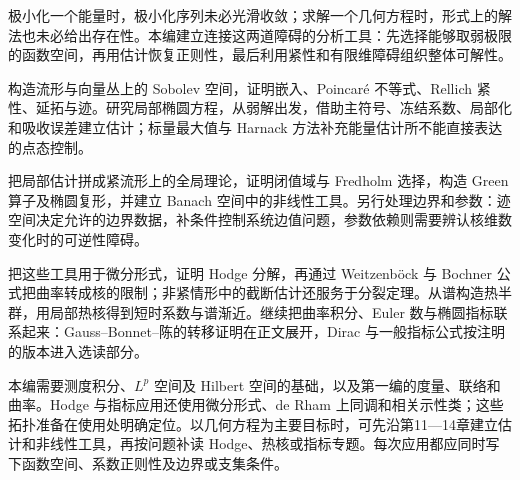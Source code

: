 
% 

\BookPartGuide
极小化一个能量时，极小化序列未必光滑收敛；求解一个几何方程时，形式上的解法也未必给出存在性。本编建立连接这两道障碍的分析工具：先选择能够取弱极限的函数空间，再用估计恢复正则性，最后利用紧性和有限维障碍组织整体可解性。

\ProseParagraphBreak
{}构造流形与向量丛上的 Sobolev 空间，证明嵌入、Poincaré 不等式、Rellich 紧性、延拓与迹。研究局部椭圆方程，从弱解出发，借助主符号、冻结系数、局部化和吸收误差建立估计；标量最大值与 Harnack 方法补充能量估计所不能直接表达的点态控制。

\ProseParagraphBreak
{}把局部估计拼成紧流形上的全局理论，证明闭值域与 Fredholm 选择，构造 Green 算子及椭圆复形，并建立 Banach 空间中的非线性工具。另行处理边界和参数：迹空间决定允许的边界数据，补条件控制系统边值问题，参数依赖则需要辨认核维数变化时的可逆性障碍。

\ProseParagraphBreak
{}把这些工具用于微分形式，证明 Hodge 分解，再通过 Weitzenböck 与 Bochner 公式把曲率转成核的限制；非紧情形中的截断估计还服务于分裂定理。从谱构造热半群，用局部热核得到短时系数与谱渐近。继续把曲率积分、Euler 数与椭圆指标联系起来：Gauss--Bonnet--陈的转移证明在正文展开，Dirac 与一般指标公式按注明的版本进入选读部分。

\ProseParagraphBreak
本编需要测度积分、\(L^p\) 空间及 Hilbert 空间的基础，以及第一编的度量、联络和曲率。Hodge 与指标应用还使用微分形式、de Rham 上同调和相关示性类；这些拓扑准备在使用处明确定位。以几何方程为主要目标时，可先沿第11—14章建立估计和非线性工具，再按问题补读 Hodge、热核或指标专题。每次应用都应同时写下函数空间、系数正则性及边界或支集条件。








